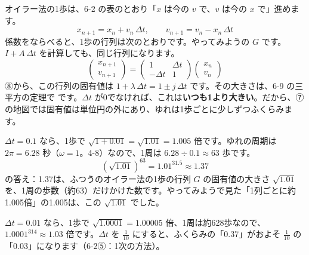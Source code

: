 オイラー法の1歩は、6-2 の表のとおり「$x$ は今の $v$ で、$v$ は今の $x$ で」進めます。
\[ x_{n+1}=x_n+v_n\,\Delta t,\qquad v_{n+1}=v_n-x_n\,\Delta t \]
係数をならべると、1歩の行列は次のとおりです。やってみようの $G$ です。$I+A\,\Delta t$ を計算しても、同じ行列になります。
\[ \begin{pmatrix}x_{n+1}\\v_{n+1}\end{pmatrix}=\begin{pmatrix}1&\Delta t\\-\Delta t&1\end{pmatrix}\begin{pmatrix}x_n\\v_n\end{pmatrix} \]
⑧から、この行列の固有値は $1+\lambda\,\Delta t=1\pm j\,\Delta t$ です。その大きさは、6-9 の三平方の定理で
です。$\Delta t$ が0でなければ、これは\textbf{いつも1より大きい}。だから、⑦の地図では固有値は単位円の外にあり、ゆれは1歩ごとに少しずつふくらみます。

$\Delta t=0.1$ なら、1歩で $\sqrt{1+0.01}=\sqrt{1.01}=1.005$ 倍です。ゆれの周期は $2\pi=6.28$ 秒（$\omega=1$。4-8）なので、1周は $6.28\div0.1\approx63$ 歩です。
\[ (\sqrt{1.01})^{63}=1.01^{31.5}\approx1.37 \]
\bkhatenaref の答え：1.37は、ふつうのオイラー法の1歩の行列 $G$ の固有値の大きさ $\sqrt{1.01}$ を、1周の歩数（約63）だけかけた数です。やってみようで見た「1列ごとに約1.005倍」の1.005は、この $\sqrt{1.01}$ でした。

$\Delta t=0.01$ なら、1歩で $\sqrt{1.0001}=1.00005$ 倍、1周は約628歩なので、$1.0001^{314}\approx1.03$ 倍です。$\Delta t$ を $\frac{1}{10}$ にすると、ふくらみの「0.37」がおよそ $\frac{1}{10}$ の「0.03」になります（6-2⑤：1次の方法）。

